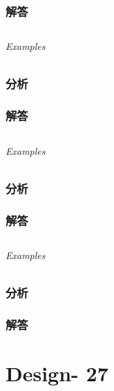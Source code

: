 \documentclass[UTF8,a4paper,12pt]{ctexbook}
\begin{document}
	\subsection{解答}
	
\section{}
	
	\subparagraph{Examples}
	
	\subsection{分析}
	
	\subsection{解答}
	
\section{}
	
	\subparagraph{Examples}
	
	\subsection{分析}
	
	\subsection{解答}
	
\section{}
	
	\subparagraph{Examples}
	
	\subsection{分析}
	
	\subsection{解答}
\chapter{Design- 27}
\section{}
	
\end{document}
